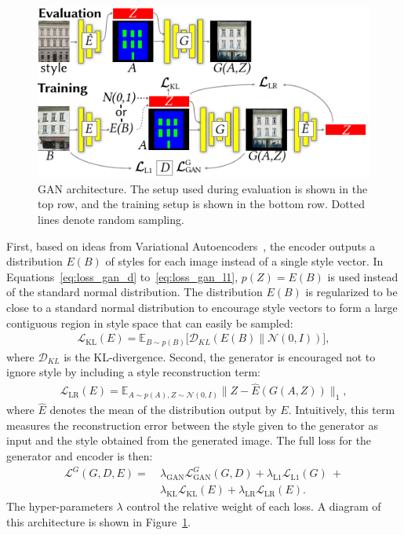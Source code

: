 \begin{figure}[t]
    \centering
    \includegraphics[width=\columnwidth]{images/gan.pdf}
    \caption{GAN architecture. The setup used during evaluation is shown in the top row, and the training setup is shown in the bottom row. Dotted lines denote random sampling.}
    \label{fig:gan}
\end{figure}

First, based on ideas from Variational Autoencoders~\cite{vae}, the encoder outputs a distribution $E(B)$ of styles for each image instead of a single style vector. In Equations~\ref{eq:loss_gan_d} to~\ref{eq:loss_gan_l1}, $p(Z) = E(B)$ is used instead of the standard normal distribution. The distribution $E(B)$ is regularized to be close to a standard normal distribution to encourage style vectors to form a large contiguous region in style space that can easily be sampled:
\begin{align}
\label{eq:loss_gan_kl}
    \mathcal{L}_{\textrm{KL}}(E) = \mathbb{E}_{B \sim p(B)}\big[\mathcal{D}_{KL}(E(B) \| \mathcal{N}(0,I))\bigr],
\end{align}
where $\mathcal{D}_{KL}$ is the KL-divergence.
Second, the generator is encouraged not to ignore style by including a style reconstruction term:
\begin{align}
\label{eq:loss_gan_lr}
    \mathcal{L}_{\textrm{LR}}(E) = \mathbb{E}_{A \sim p(A), Z \sim \mathcal{N}(0,I)}\big\|Z - \hat{E}(G(A,Z))\bigr\|_1,
\end{align}
where $\hat{E}$ denotes the mean of the distribution output by $E$.
Intuitively, this term measures the reconstruction error between the style given to the generator as input and the style obtained from the generated image. The full loss for the generator and encoder is then:
\begin{equation}
\begin{aligned}
\label{eq:loss_gan}
    \mathcal{L}^G(G,D,E) =\ &
    \lambda_{\textrm{GAN}}\mathcal{L}^G_{\textrm{GAN}}(G,D) +
    \lambda_{\textrm{L1}}\mathcal{L}_{\textrm{L1}}(G)\ + \\
    & \lambda_{\textrm{KL}}\mathcal{L}_{\textrm{KL}}(E) +
    \lambda_{\textrm{LR}}\mathcal{L}_{\textrm{LR}}(E).
\end{aligned}
\end{equation}
The hyper-parameters $\lambda$ control the relative weight of each loss. A diagram of this architecture is shown in Figure~\ref{fig:gan}.

